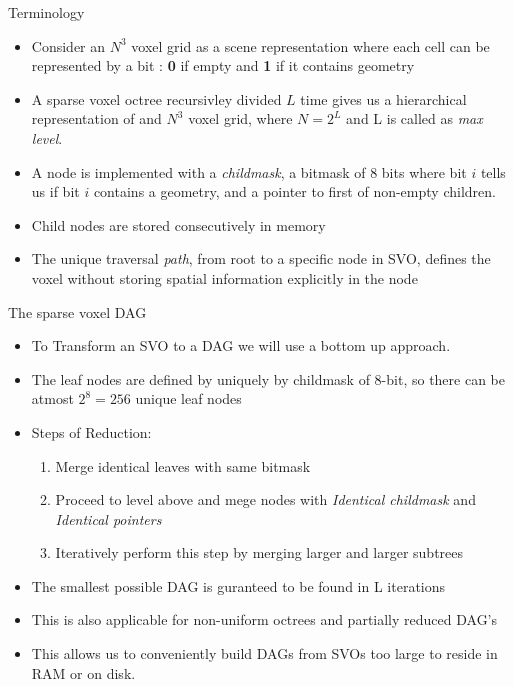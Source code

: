 \documentclass{beamer}
\begin{document}
\begin{frame}{Terminology}
	\begin{itemize}
		\item{
		Consider an $N^3$ voxel grid as a scene representation where each cell can be represented by a bit : \textbf{0} if empty and \textbf{1} if it contains geometry
		}
		\item{
			A sparse voxel octree recursivley divided $L$ time gives us a hierarchical representation of and $N^3$ voxel grid, where $N = 2^L$ and L is called as \textit{max level}.
		}
		\item{
			A node is implemented with a \textit{childmask}, a bitmask of 8 bits where bit $i$ tells us if bit $i$  contains a geometry, and a pointer to first of non-empty children.
		}
		\item{
			Child nodes are stored consecutively in memory	
		}
		\item{
			The unique traversal \textit{path}, from root to a specific node in SVO, defines the voxel without storing spatial information explicitly in the node 
		}
	\end{itemize}
\end{frame}


\begin{frame}{The sparse voxel DAG}
	\begin{itemize}
		\item{
		To Transform an SVO to a DAG we will use a bottom up approach.
		}
		\item{
		The leaf nodes are defined by uniquely by childmask of 8-bit, so there can be atmost $2^8=256$ unique leaf nodes}
		\item{
		Steps of Reduction:
			\begin{enumerate}
				\item{Merge identical leaves with same bitmask}
				\item{Proceed to level above and mege nodes with \textit{Identical childmask} and \textit{Identical pointers}}
				\item{Iteratively perform this step by merging larger and larger subtrees}
			\end{enumerate}
		}
		\item{The smallest possible DAG is guranteed to be found in L iterations}
		\item{
		This is also applicable for non-uniform octrees and partially reduced DAG's
		}
		\item{
		This allows us to conveniently build DAGs from	SVOs too large to reside in RAM or on disk.
		}
		
	\end{itemize}
\end{frame}
\end{document}
